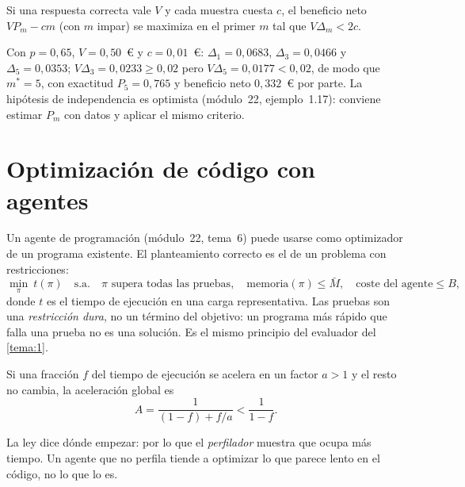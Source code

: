 \begin{corolario}\label{cor:m-optimo}
Si una respuesta correcta vale $V$ y cada muestra cuesta $c$, el beneficio neto $V P_m-cm$ (con $m$ impar) se maximiza en el primer $m$ tal que $V\Delta_m<2c$.
\end{corolario}

Con $p=0{,}65$, $V=0{,}50$~€ y $c=0{,}01$~€: $\Delta_1=0{,}0683$, $\Delta_3=0{,}0466$ y $\Delta_5=0{,}0353$; $V\Delta_3=0{,}0233\ge0{,}02$ pero $V\Delta_5=0{,}0177<0{,}02$, de modo que $m^{*}=5$, con exactitud $P_5=0{,}765$ y beneficio neto $0{,}332$~€ por parte. La hipótesis de independencia es optimista (módulo~22, ejemplo~1.17): conviene estimar $P_m$ con datos y aplicar el mismo criterio.

\section{Optimización de código con agentes}

Un agente de programación (módulo~22, tema~6) puede usarse como optimizador de un programa existente. El planteamiento correcto es el de un problema con restricciones:
\[
\min_{\pi}\ t(\pi)\quad\text{s.a.}\quad \pi \text{ supera todas las pruebas},\quad \text{memoria}(\pi)\le \bar M,\quad \text{coste del agente}\le B,
\]
donde $t$ es el tiempo de ejecución en una carga representativa. Las pruebas son una \emph{restricción dura}, no un término del objetivo: un programa más rápido que falla una prueba no es una solución. Es el mismo principio del evaluador del \cref{tema:1}.

\begin{proposicion}\label{prop:amdahl}
Si una fracción $f$ del tiempo de ejecución se acelera en un factor $a>1$ y el resto no cambia, la aceleración global es
\[
A=\frac{1}{(1-f)+f/a}<\frac{1}{1-f}.
\]
\end{proposicion}

La ley dice dónde empezar: por lo que el \emph{perfilador} muestra que ocupa más tiempo. Un agente que no perfila tiende a optimizar lo que parece lento en el código, no lo que lo es.

\addtocounter{definicion}{1}%

